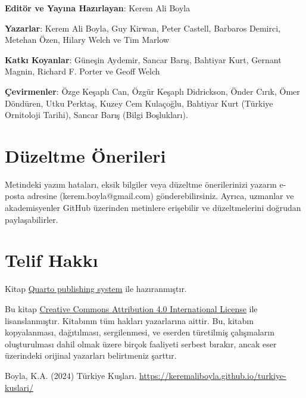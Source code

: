 \documentclass[
  a4paper,
  DIV=11,
  numbers=noendperiod]{scrreprt}
\begin{document}

\textbf{Editör ve Yayına Hazırlayan}: Kerem Ali Boyla

\textbf{Yazarlar}: Kerem Ali Boyla, Guy Kirwan, Peter Castell, Barbaros
Demirci, Metehan Özen, Hilary Welch ve Tim Marlow

\textbf{Katkı Koyanlar}: Güneşin Aydemir, Sancar Barış, Bahtiyar Kurt,
Gernant Magnin, Richard F. Porter ve Geoff Welch

\textbf{Çevirmenler}: Özge Keşaplı Can, Özgür Keşaplı Didrickson, Önder
Cırık, Ömer Döndüren, Utku Perktaş, Kuzey Cem Kulaçoğlu, Bahtiyar Kurt
(Türkiye Ornitoloji Tarihi), Sancar Barış (Bilgi Boşlukları).

\section*{Düzeltme Önerileri}\label{duxfczeltme-uxf6nerileri}


Metindeki yazım hataları, eksik bilgiler veya düzeltme önerilerinizi
yazarın e-posta adresine (kerem.boyla@gmail.com) gönderebilirsiniz.
Ayrıca, uzmanlar ve akademisyenler GitHub üzerinden metinlere erişebilir
ve düzeltmelerini doğrudan paylaşabilirler.

\section*{Telif Hakkı}\label{telif-hakkux131}


Kitap \href{https://quarto.org/}{Quarto publishing system} ile
hazıranmıştır.

Bu kitap \href{https://creativecommons.org/licenses/by/4.0/}{Creative
Commons Attribution 4.0 International License} ile lisanslanmıştır.
Kitabının tüm hakları yazarlarına aittir. Bu, kitabın kopyalanması,
dağıtılması, sergilenmesi, ve eserden türetilmiş çalışmaların
oluşturulması dahil olmak üzere birçok faaliyeti serbest bırakır, ancak
eser üzerindeki orijinal yazarları belirtmeniz şarttır.

Boyla, K.A. (2024) Türkiye Kuşları.
\url{https://keremaliboyla.github.io/turkiye-kuslari/}

\section*{}\label{section}
\end{document}
